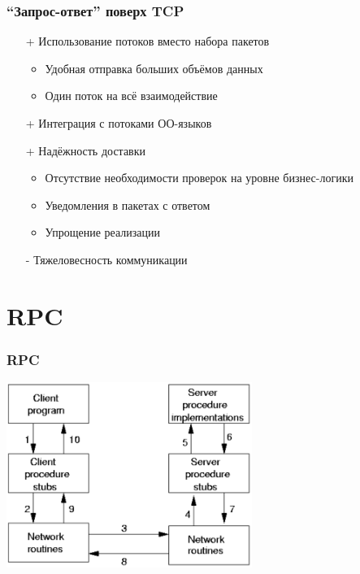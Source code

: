 \documentclass[xetex,mathserif,serif]{beamer}
\begin{document}
    \begin{frame}
        \frametitle{``Запрос-ответ'' поверх TCP}
        \begin{itemize}
            \item[+] Использование потоков вместо набора пакетов
            \begin{itemize}
                \item Удобная отправка больших объёмов данных
                \item Один поток на всё взаимодействие
            \end{itemize}
            \item[+] Интеграция с потоками ОО-языков
            \item[+] Надёжность доставки
            \begin{itemize}
                \item Отсутствие необходимости проверок на уровне бизнес-логики
                \item Уведомления в пакетах с ответом
                \item Упрощение реализации
            \end{itemize}
            \item[-] Тяжеловесность коммуникации
        \end{itemize}
    \end{frame}

    \section{RPC}

    \begin{frame}
        \frametitle{RPC}
        \begin{center}
            \includegraphics[width=0.6\textwidth]{rpc.png}
        \end{center}
    \end{frame}
\end{document}
